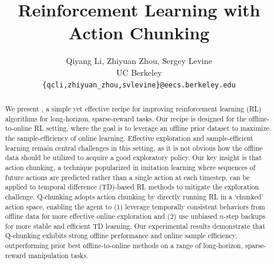 \documentclass{article}
\title{Reinforcement Learning with Action Chunking}
\author{%
  Qiyang Li, Zhiyuan Zhou, Sergey Levine \\ UC Berkeley \\ \texttt{\{qcli,zhiyuan\_zhou,svlevine\}@eecs.berkeley.edu} 
}
\begin{document}
\hypersetup{colorlinks=true, allcolors=ourblue}

\maketitle
\begin{abstract}
We present , a simple yet effective recipe for improving reinforcement learning (RL) algorithms for long-horizon, sparse-reward tasks. Our recipe is designed for the offline-to-online RL setting, where the goal is to leverage an offline prior dataset to maximize the sample-efficiency of online learning. Effective exploration and sample-efficient learning remain central challenges in this setting, as it is not obvious how the offline data should be utilized to acquire a good exploratory policy. 
Our key insight is that action chunking, a technique popularized in imitation learning where sequences of future actions are predicted rather than a single action at each timestep, can be applied to temporal difference (TD)-based RL methods to mitigate the exploration challenge.
Q-chunking adopts action chunking by directly running RL in a `chunked' action space, enabling the agent to (1) leverage temporally consistent behaviors from offline data for more effective online exploration and (2) use unbiased $n$-step backups for more stable and efficient TD learning. Our experimental results demonstrate that Q-chunking exhibits strong offline performance and online sample efficiency, outperforming prior best offline-to-online methods on a range of long-horizon, sparse-reward manipulation tasks. 
\begin{figure}[H]


\end{figure}
\end{abstract}
\end{document}
